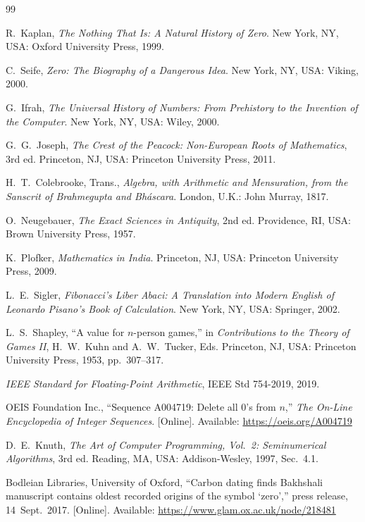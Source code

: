 \documentclass[11pt,a4paper]{article}
\theoremstyle{definition}
\begin{document}
\begin{thebibliography}{99}
 
 R.~Kaplan, \emph{The Nothing That Is: A Natural History of Zero}. New York, NY, USA: Oxford University Press, 1999.
 
 C.~Seife, \emph{Zero: The Biography of a Dangerous Idea}. New York, NY, USA: Viking, 2000.
 
 G.~Ifrah, \emph{The Universal History of Numbers: From Prehistory to the Invention of the Computer}. New York, NY, USA: Wiley, 2000.
 
 G.~G.~Joseph, \emph{The Crest of the Peacock: Non-European Roots of Mathematics}, 3rd ed. Princeton, NJ, USA: Princeton University Press, 2011.
 
 H.~T.~Colebrooke, Trans., \emph{Algebra, with Arithmetic and Mensuration, from the Sanscrit of Brahmegupta and Bh\'ascara}. London, U.K.: John Murray, 1817.
 
 O.~Neugebauer, \emph{The Exact Sciences in Antiquity}, 2nd ed. Providence, RI, USA: Brown University Press, 1957.
 
 K.~Plofker, \emph{Mathematics in India}. Princeton, NJ, USA: Princeton University Press, 2009.
 
 L.~E.~Sigler, \emph{Fibonacci's Liber Abaci: A Translation into Modern English of Leonardo Pisano's Book of Calculation}. New York, NY, USA: Springer, 2002.
 
 L.~S.~Shapley, ``A value for $n$-person games,'' in \emph{Contributions to the Theory of Games II}, H.~W.~Kuhn and A.~W.~Tucker, Eds. Princeton, NJ, USA: Princeton University Press, 1953, pp.~307--317.
 
 \emph{IEEE Standard for Floating-Point Arithmetic}, IEEE Std 754-2019, 2019.
 
 OEIS Foundation Inc., ``Sequence A004719: Delete all 0's from $n$,'' \emph{The On-Line Encyclopedia of Integer Sequences}. [Online]. Available: \url{https://oeis.org/A004719}
 
 D.~E.~Knuth, \emph{The Art of Computer Programming, Vol.~2: Seminumerical Algorithms}, 3rd ed. Reading, MA, USA: Addison-Wesley, 1997, Sec.~4.1.
 
 Bodleian Libraries, University of Oxford, ``Carbon dating finds Bakhshali manuscript contains oldest recorded origins of the symbol `zero','' press release, 14~Sept.~2017. [Online]. Available: \url{https://www.glam.ox.ac.uk/node/218481}
 

\end{thebibliography}
\end{document}
